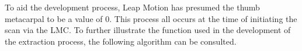 \renewcommand{\umltextcolor}{black}
\renewcommand{\umldrawcolor}{black}
\renewcommand{\umlfillcolor}{white}

\begin{center}
\end{center}


To aid the development process, Leap Motion has presumed the thumb metacarpal to be a value of 0.
This process all occurs at the time of initiating the scan via the LMC. To further illustrate the function used in the development of the extraction process, the following algorithm can be consulted.
    





